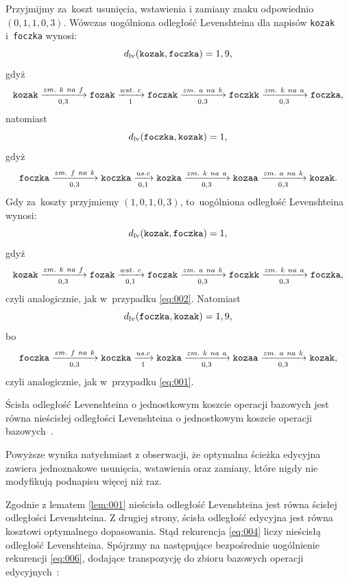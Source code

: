 \documentclass{praca1}
\begin{document}
\begin{example}
Przyjmijmy za~koszt usunięcia, wstawienia i zamiany znaku odpowiednio $(0,1, 1, 0,3)$. Wówczas uogólniona odległość Levenshteina dla napisów \verb|kozak| i~\verb|foczka| wynosi:
\begin{equation}
\label{eq:001}
d_{\mathrm{lv}}(\verb|kozak|, \verb|foczka|) = 1,9,
\end{equation}
gdyż
$$
\verb|kozak|  \xrightarrow[0,3]{zm.\ k\ na\ f} \verb|fozak| \xrightarrow[1]{wst.\ c} \verb|foczak| \xrightarrow[0,3]{zm.\ a\ na\ k} \verb|foczkk| \xrightarrow[0,3]{zm.\ k\ na\ a} \verb|foczka|,
$$
natomiast
\begin{equation}\label{eq:002}
d_{\mathrm{lv}}(\verb|foczka|, \verb|kozak|) = 1,
\end{equation}
gdyż
$$
\verb|foczka|  \xrightarrow[0,3]{zm.\ f\ na\ k} \verb|koczka|  \xrightarrow[0,1]{us. c} \verb|kozka| \xrightarrow[0,3]{zm.\ k\ na\ a} \verb|kozaa| \xrightarrow[0,3]{zm.\ a\ na\ k} \verb|kozak|.
$$
Gdy za~koszty przyjmiemy $(1, 0,1, 0,3)$, to~uogólniona odległość Levenshteina wynosi:
$$
d_{\mathrm{lv}}(\verb|kozak|, \verb|foczka|) = 1,
$$
gdyż
$$
\verb|kozak|  \xrightarrow[0,3]{zm.\ k\ na\ f} \verb|fozak| \xrightarrow[0,1]{wst.\ c} \verb|foczak| \xrightarrow[0,3]{zm.\ a\ na\ k} \verb|foczkk| \xrightarrow[0,3]{zm.\ k\ na\ a} \verb|foczka|,
$$
czyli analogicznie, jak w~przypadku \eqref{eq:002}. Natomiast
$$
d_{\mathrm{lv}}(\verb|foczka|, \verb|kozak|) = 1,9,
$$
bo
$$
\verb|foczka|  \xrightarrow[0,3]{zm.\ f\ na\ k} \verb|koczka|  \xrightarrow[1]{us. c} \verb|kozka| \xrightarrow[0,3]{zm.\ k\ na\ a} \verb|kozaa| \xrightarrow[0,3]{zm.\ a\ na\ k} \verb|kozak|,
$$
czyli analogicznie, jak w~przypadku \eqref{eq:001}.
\end{example}


\begin{lemma}
\label{lem:001}
Ścisła odległość Levenshteina o jednostkowym koszcie operacji bazowych jest równa nieścisłej odległości Levenshteina o jednostkowym koszcie operacji bazowych~\cite{Boytsov2011:indexingmethods}.
\end{lemma}

Powyższe wynika natychmiast z obserwacji, że optymalna ścieżka edycyjna zawiera jednoznakowe usunięcia, wstawienia oraz zamiany, które nigdy nie modyfikują podnapisu więcej niż raz.


Zgodnie z lematem \ref{lem:001} nieścisła odległość Levenshteina jest równa ścisłej odległości Levenshteina. Z drugiej strony, ścisła odległość edycyjna jest równa kosztowi optymalnego dopasowania. Stąd rekurencja \eqref{eq:004} liczy nieścisłą odległość Levenshteina. Spójrzmy na następujące bezpośrednie uogólnienie rekurencji \eqref{eq:006}, dodające transpozycję do zbioru bazowych operacji edycyjnych~\cite{Boytsov2011:indexingmethods}:
\end{document}
